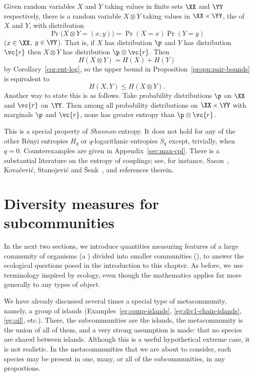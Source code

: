 \begin{remark}
Given random variables $X$ and $Y$ taking values in finite sets $\XX$ and
$\YY$ respectively, there is a random variable $X \otimes Y$ taking values
in $\XX \times \YY$, the %
%
%
%
of $X$ and $Y$, with
distribution
\[
\Pr\bigl( X \otimes Y = (x, y) \bigr)
=
\Pr(X = x) \Pr(Y = y)
\]
($x \in \XX$, $y \in \YY$).  That is, if $X$ has distribution $\p$ and $Y$
has distribution $\vc{r}$ then $X \otimes Y$ has distribution $\p \otimes
\vc{r}$.  Then
\[
H(X \otimes Y) = H(X) + H(Y)
\]
by Corollary~\ref{cor:ent-log}, so the upper bound in
Proposition~\ref{propn:pair-bounds} is equivalent
to
\[
H(X, Y) \leq H(X \otimes Y).
\]
Another way to state this is as follows.  Take probability distributions
$\p$ on $\XX$ and $\vc{r}$ on $\YY$.  Then among all probability
distributions on $\XX \times \YY$ with marginals $\p$ and $\vc{r}$,
none has greater entropy than $\p \otimes \vc{r}$.

This is a special property of \emph{Shannon} entropy.  It does not hold for
any of the other R\'enyi entropies $H_q$ or $q$-logarithmic entropies $S_q$
except, trivially, when $q = 0$.  Counterexamples are given in
Appendix~\ref{sec:max-cpl}.  There is a substantial literature on the
entropy of couplings; see, for instance, Sason~\cite{Saso},
Kova\v{c}evi\'{c}, Stanojevi\'{c} and \v{S}enk~\cite{KSS}, and references
therein.
\end{remark}


\section{Diversity measures for subcommunities}


In the next two sections, we introduce quantities measuring
features of a large community of organisms (a ) divided
into smaller communities (), to
answer the ecological questions posed in the introduction to this
chapter.  As before, we use terminology inspired by ecology, even though
the mathematics applies far more generally to any types of object.

We have already discussed several times a special type of metacommunity,
namely, a group of islands%
%
% 
(Examples~\ref{eg:comp-islands}, \ref{eg:div1-chain-islands}, \ref{eg:oil},
etc.).  There, the subcommunities are the islands, the metacommunity is the
union of all of them, and a very strong assumption is made: that no species
are shared between islands. Although this is a useful hypothetical extreme
case, it is not realistic.  In the metacommunities that we are about to
consider, each species may be present in one, many, or all of the
subcommunities, in any proportions.


